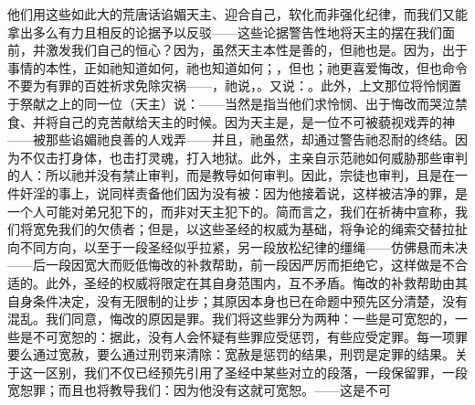 他们用这些如此大的荒唐话谄媚天主、迎合自己，软化而非强化纪律，而我们又能拿出多么有力且相反的论据予以反驳——这些论据警告性地将天主的摆在我们面前，并激发我们自己的恒心？因为，虽然天主本性是善的，但祂也是。因为，出于事情的本性，正如祂知道如何，祂也知道如何；，但也；祂更喜爱悔改，但也命令不要为有罪的百姓祈求免除灾祸——，祂说，。又说：。此外，上文那位将怜悯置于祭献之上的同一位（天主）说：——当然是指当他们求怜悯、出于悔改而哭泣禁食、并将自己的克苦献给天主的时候。因为天主是，是一位不可被藐视戏弄的神——被那些谄媚祂良善的人戏弄——并且，祂虽然，却通过警告祂忍耐的终结。因为不仅击打身体，也击打灵魂，打入地狱。此外，主亲自示范祂如何威胁那些审判的人：所以祂并没有禁止审判，而是教导如何审判。因此，宗徒也审判，且是在一件奸淫的事上，说同样责备他们因为没有被：因为他接着说，这样被洁净的罪，是一个人可能对弟兄犯下的，而非对天主犯下的。简而言之，我们在祈祷中宣称，我们将宽免我们的欠债者；但是，以这些圣经的权威为基础，将争论的绳索交替拉扯向不同方向，以至于一段圣经似乎拉紧，另一段放松纪律的缰绳——仿佛悬而未决——后一段因宽大而贬低悔改的补救帮助，前一段因严厉而拒绝它，这样做是不合适的。此外，圣经的权威将限定在其自身范围内，互不矛盾。悔改的补救帮助由其自身条件决定，没有无限制的让步；其原因本身也已在命题中预先区分清楚，没有混乱。我们同意，悔改的原因是罪。我们将这些罪分为两种：一些是可宽恕的，一些是不可宽恕的：据此，没有人会怀疑有些罪应受惩罚，有些应受定罪。每一项罪要么通过宽赦，要么通过刑罚来清除：宽赦是惩罚的结果，刑罚是定罪的结果。关于这一区别，我们不仅已经预先引用了圣经中某些对立的段落，一段保留罪，一段宽恕罪；而且也将教导我们：因为他没有这就可宽恕。——这是不可